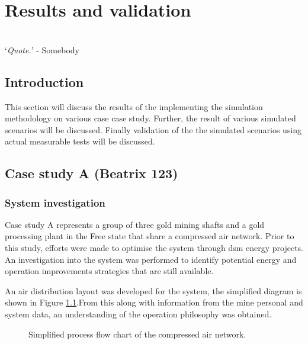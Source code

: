 \chapter{Results and validation}
\thispagestyle{empty}
\vspace{38em}
\hrulefill
\\
\enquote*{\textit{Quote.}} - Somebody\\
\newpage
\section{Introduction}
This section will discuss the results of the implementing the simulation methodology on various case case study. Further, the result of various simulated scenarios will be discussed. Finally validation of the the simulated scenarios using actual measurable tests will be discussed.
\section{Case study A \tiny{\color{blue}(Beatrix 123)}}

\subsection{System investigation}
Case study A represents a group of three gold mining shafts and a gold processing plant in the Free state that share a compressed air network. Prior to this study, efforts were made to optimise the system through \gls{dsm} energy projects. An investigation into the system was performed to identify potential energy and operation improvements strategies that are still available.
\par 
An air distribution layout was developed for the system, the simplified diagram is shown in Figure \ref{fig: Beatrix Air layout}.From this along with information from the mine personal and system data, an understanding of the operation philosophy was obtained. 
\par 
\begin{figure}[h!]
	\centering
	\caption{Simplified process flow chart of the compressed air network.}
	\label{fig: Beatrix Air layout}
\end{figure}

